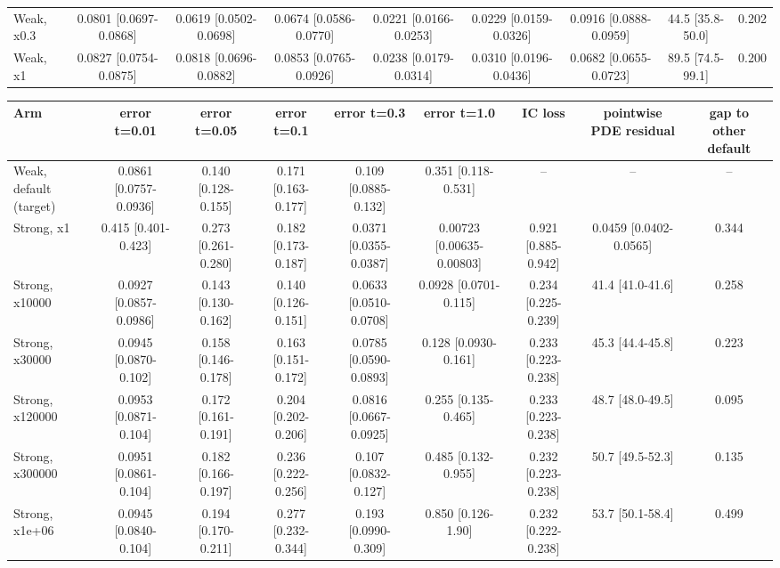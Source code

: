 \begin{tabular}{lcccccccc}
Weak, x0.3 & 0.0801 {\scriptsize[0.0697-0.0868]} & 0.0619 {\scriptsize[0.0502-0.0698]} & 0.0674 {\scriptsize[0.0586-0.0770]} & 0.0221 {\scriptsize[0.0166-0.0253]} & 0.0229 {\scriptsize[0.0159-0.0326]} & 0.0916 {\scriptsize[0.0888-0.0959]} & 44.5 {\scriptsize[35.8-50.0]} & 0.202 \\
Weak, x1 & 0.0827 {\scriptsize[0.0754-0.0875]} & 0.0818 {\scriptsize[0.0696-0.0882]} & 0.0853 {\scriptsize[0.0765-0.0926]} & 0.0238 {\scriptsize[0.0179-0.0314]} & 0.0310 {\scriptsize[0.0196-0.0436]} & 0.0682 {\scriptsize[0.0655-0.0723]} & 89.5 {\scriptsize[74.5-99.1]} & 0.200 \\
\bottomrule
\end{tabular}

\begin{tabular}{lcccccccc}
\toprule
Arm & error t=0.01 & error t=0.05 & error t=0.1 & error t=0.3 & error t=1.0 & IC loss & pointwise PDE residual & gap to other default \\
\midrule
Weak, default (target) & 0.0861 {\scriptsize[0.0757-0.0936]} & 0.140 {\scriptsize[0.128-0.155]} & 0.171 {\scriptsize[0.163-0.177]} & 0.109 {\scriptsize[0.0885-0.132]} & 0.351 {\scriptsize[0.118-0.531]} & -- & -- & -- \\
Strong, x1 & 0.415 {\scriptsize[0.401-0.423]} & 0.273 {\scriptsize[0.261-0.280]} & 0.182 {\scriptsize[0.173-0.187]} & 0.0371 {\scriptsize[0.0355-0.0387]} & 0.00723 {\scriptsize[0.00635-0.00803]} & 0.921 {\scriptsize[0.885-0.942]} & 0.0459 {\scriptsize[0.0402-0.0565]} & 0.344 \\
Strong, x10000 & 0.0927 {\scriptsize[0.0857-0.0986]} & 0.143 {\scriptsize[0.130-0.162]} & 0.140 {\scriptsize[0.126-0.151]} & 0.0633 {\scriptsize[0.0510-0.0708]} & 0.0928 {\scriptsize[0.0701-0.115]} & 0.234 {\scriptsize[0.225-0.239]} & 41.4 {\scriptsize[41.0-41.6]} & 0.258 \\
Strong, x30000 & 0.0945 {\scriptsize[0.0870-0.102]} & 0.158 {\scriptsize[0.146-0.178]} & 0.163 {\scriptsize[0.151-0.172]} & 0.0785 {\scriptsize[0.0590-0.0893]} & 0.128 {\scriptsize[0.0930-0.161]} & 0.233 {\scriptsize[0.223-0.238]} & 45.3 {\scriptsize[44.4-45.8]} & 0.223 \\
Strong, x120000 & 0.0953 {\scriptsize[0.0871-0.104]} & 0.172 {\scriptsize[0.161-0.191]} & 0.204 {\scriptsize[0.202-0.206]} & 0.0816 {\scriptsize[0.0667-0.0925]} & 0.255 {\scriptsize[0.135-0.465]} & 0.233 {\scriptsize[0.223-0.238]} & 48.7 {\scriptsize[48.0-49.5]} & 0.095 \\
Strong, x300000 & 0.0951 {\scriptsize[0.0861-0.104]} & 0.182 {\scriptsize[0.166-0.197]} & 0.236 {\scriptsize[0.222-0.256]} & 0.107 {\scriptsize[0.0832-0.127]} & 0.485 {\scriptsize[0.132-0.955]} & 0.232 {\scriptsize[0.223-0.238]} & 50.7 {\scriptsize[49.5-52.3]} & 0.135 \\
Strong, x1e+06 & 0.0945 {\scriptsize[0.0840-0.104]} & 0.194 {\scriptsize[0.170-0.211]} & 0.277 {\scriptsize[0.232-0.344]} & 0.193 {\scriptsize[0.0990-0.309]} & 0.850 {\scriptsize[0.126-1.90]} & 0.232 {\scriptsize[0.222-0.238]} & 53.7 {\scriptsize[50.1-58.4]} & 0.499 \\
\bottomrule
\end{tabular}


